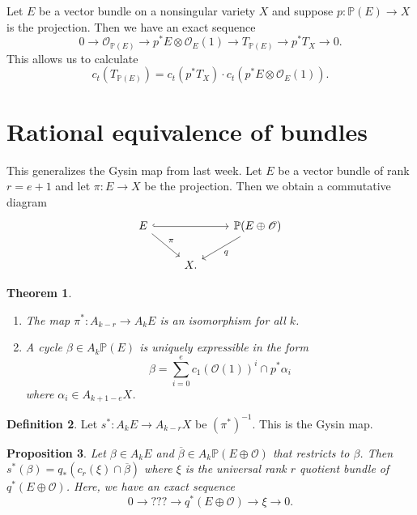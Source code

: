 \documentclass[leqno, openany]{memoir}
\newtheorem{thm}{Theorem}[section]
\newtheorem{prop}[thm]{Proposition}
\theoremstyle{definition}
\newtheorem{defn}[thm]{Definition}
\theoremstyle{remark}
\theoremstyle{plain}
\theoremstyle{definition}
\theoremstyle{remark}
\renewcommand{\P}{\mathbb{P}}
\newcommand{\msc}[1]{\mathscr{#1}}
\newcommand{\ol}[1]{\overline{#1}}
\begin{document}
Let $E$ be a vector bundle on a nonsingular variety $X$ and suppose $p \colon \P(E) \to X$ is the projection. Then we have an exact sequence
\[ 0 \to \msc{O}_{\P(E)} \to p^* E \otimes \msc{O}_E(1) \to T_{\P(E)} \to p^* T_X \to 0. \]
This allows us to calculate
\[ c_t(T_{\P(E)}) = c_t(p^* T_X) \cdot c_t(p^*E \otimes \msc{O}_E(1)). \]

\section{Rational equivalence of bundles}%
\label{sec:rational_equivalence_of_bundles}

This generalizes the Gysin map from last week. Let $E$ be a vector bundle of rank $r = e+1$ and let $\pi \colon E \to X$ be the projection. Then we obtain a commutative diagram
\begin{equation*}
\begin{tikzcd}
    E \ar[hookrightarrow]{rr} \ar{dr}{\pi} & & \P(E \oplus \msc{O}) \ar{dl}{q} \\
                                           & X.
\end{tikzcd}
\end{equation*}

\begin{thm}\leavevmode
    \begin{enumerate}
        \item The map $\pi^* \colon A_{k-r} \to A_k E$ is an isomorphism for all $k$.
        \item A cycle $\beta \in A_k \P(E)$ is uniquely expressible in the form
            \[ \beta = \sum_{i=0}^e {c_1(\msc{O}(1))}^i \cap p^* \alpha_i \]
            where $\alpha_i \in A_{k+1-e} X$.
    \end{enumerate}
\end{thm}

\begin{defn}
    Let $s^* \colon A_k E \to A_{k-r} X$ be ${(\pi^*)}^{-1}$. This is the Gysin map. 
\end{defn}

\begin{prop}
    Let $\beta \in A_k E$ and $\ol{\beta} \in A_k \P(E \oplus \msc{O})$ that restricts to $\beta$. Then $s^*(\beta) = q_* (c_r(\xi) \cap \ol{\beta})$ where $\xi$ is the universal rank $r$ quotient bundle of $q^* (E \oplus \msc{O})$. Here, we have an exact sequence
    \[ 0 \to {???} \to q^*(E \oplus \msc{O}) \to \xi \to 0. \]
\end{prop}
\end{document}
